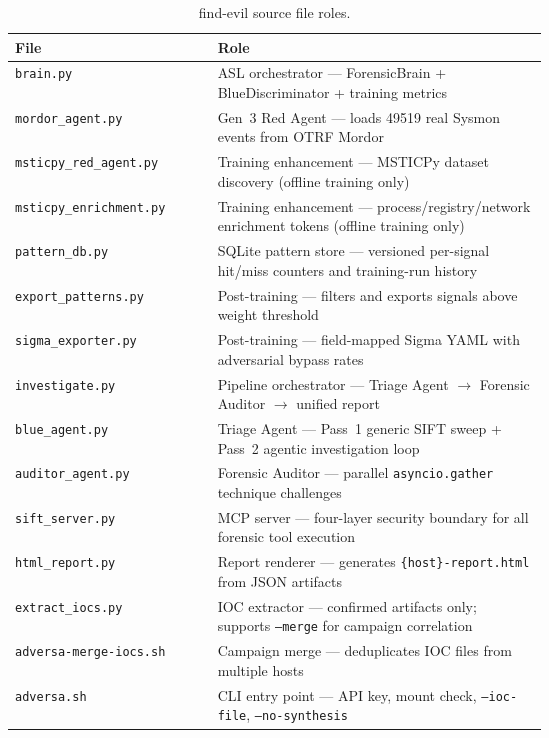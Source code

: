 \documentclass[sigconf, nonacm]{acmart}
\begin{document}
\begin{table}[ht]
\centering
\caption{find-evil source file roles.}
\begin{tabular}{@{}lp{0.62\linewidth}@{}}
\toprule
File & Role \\
\midrule
\texttt{brain.py}               & ASL orchestrator — ForensicBrain + BlueDiscriminator + training metrics \\
\texttt{mordor\_agent.py}       & Gen~3 Red Agent — loads \num{49519} real Sysmon events from OTRF Mordor \\
\texttt{msticpy\_red\_agent.py} & Training enhancement — MSTICPy dataset discovery (offline training only) \\
\texttt{msticpy\_enrichment.py} & Training enhancement — process/registry/network enrichment tokens (offline training only) \\
\texttt{pattern\_db.py}         & SQLite pattern store — versioned per-signal hit/miss counters and training-run history \\
\texttt{export\_patterns.py}    & Post-training — filters and exports signals above weight threshold \\
\texttt{sigma\_exporter.py}     & Post-training — field-mapped Sigma YAML with adversarial bypass rates \\
\texttt{investigate.py}         & Pipeline orchestrator — Triage Agent $\to$ Forensic Auditor $\to$ unified report \\
\texttt{blue\_agent.py}         & Triage Agent — Pass~1 generic SIFT sweep + Pass~2 agentic investigation loop \\
\texttt{auditor\_agent.py}      & Forensic Auditor — parallel \texttt{asyncio.gather} technique challenges \\
\texttt{sift\_server.py}        & MCP server — four-layer security boundary for all forensic tool execution \\
\texttt{html\_report.py}        & Report renderer — generates \texttt{\{host\}-report.html} from JSON artifacts \\
\texttt{extract\_iocs.py}       & IOC extractor — confirmed artifacts only; supports \texttt{--merge} for campaign correlation \\
\texttt{adversa-merge-iocs.sh}  & Campaign merge — deduplicates IOC files from multiple hosts \\
\texttt{adversa.sh}             & CLI entry point — API key, mount check, \texttt{--ioc-file}, \texttt{--no-synthesis} \\
\bottomrule
\end{tabular}
\end{table}


\end{document}
